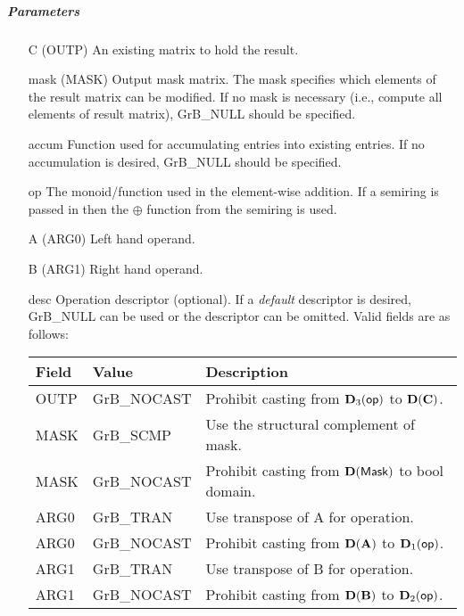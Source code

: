 \subparagraph{Parameters}

\begin{itemize}[leftmargin=1.1in]
    \item[{\sf C}]     ({\sf OUTP}) An existing matrix to hold the result.

    \item[{\sf mask}] ({\sf MASK}) Output mask matrix. The mask
    specifies which elements of the result matrix can be modified.
    If no mask is necessary (i.e., compute all elements of result
    matrix), {\sf GrB\_NULL} should be specified.

    \item[{\sf accum}]  Function used for accumulating entries into existing
                         entries. If no accumulation is desired,
                        {\sf GrB\_NULL} should be specified.

    \item[{\sf op}]    The monoid/function used in the element-wise addition.
                       If a semiring is passed in then the $\oplus$ function from
                                    the semiring is used.
    \item[{\sf A}]     ({\sf ARG0}) Left hand operand.
    \item[{\sf B}]     ({\sf ARG1}) Right hand operand.
    
    \item[{\sf desc}]  Operation descriptor (optional). If a
    \emph{default} descriptor is desired, {\sf GrB\_NULL} can be
    used or the descriptor can be omitted. Valid fields are as follows: \\
    \begin{tabular}{lll}
        Field  & Value & Description \\
        \hline
        {\sf OUTP} & {\sf GrB\_NOCAST} & Prohibit casting from $\bold{D}_3({\sf op})$ to $\bold{D}({\bf C})$. \\
        {\sf MASK} & {\sf GrB\_SCMP} & Use the structural complement of {\sf mask}. \\
    {\sf MASK} & {\sf GrB\_NOCAST} & Prohibit casting from $\bold{D}({\sf Mask})$ to {\sf bool} domain. \\
    {\sf ARG0} & {\sf GrB\_TRAN} & Use transpose of {\sf A} for operation. \\
        {\sf ARG0} & {\sf GrB\_NOCAST} & Prohibit casting from $\bold{D}({\bf A})$ to $\bold{D}_1({\sf op})$. \\
    {\sf ARG1} & {\sf GrB\_TRAN} & Use transpose of {\sf B} for operation. \\
        {\sf ARG1} & {\sf GrB\_NOCAST} & Prohibit casting from $\bold{D}({\bf B})$ to $\bold{D}_2({\sf op})$. \\
    \end{tabular}
\end{itemize}

